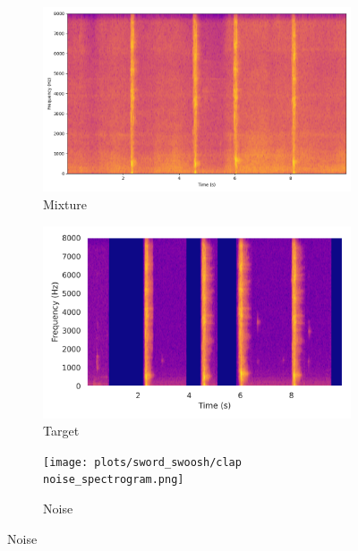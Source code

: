 \begin{figure}[!htbp]

    \begin{subfigure}[b]{0.3\textwidth}
        \centering
        \includegraphics[width=\textwidth]{plots/sword_swoosh/clap mixture_spectrogram.png}
        \caption*{Mixture}
    \end{subfigure}
    \begin{subfigure}[b]{0.3\textwidth}
        \centering
        \includegraphics[width=\textwidth]{plots/sword_swoosh/clap target_spectrogram.png}
        \caption*{Target}
    \end{subfigure}
     \begin{subfigure}[b]{0.3\textwidth}
        \centering
        \texttt{[image: plots/sword\_swoosh/clap noise\_spectrogram.png]}
        \caption*{Noise}
    \end{subfigure}


\end{figure}
